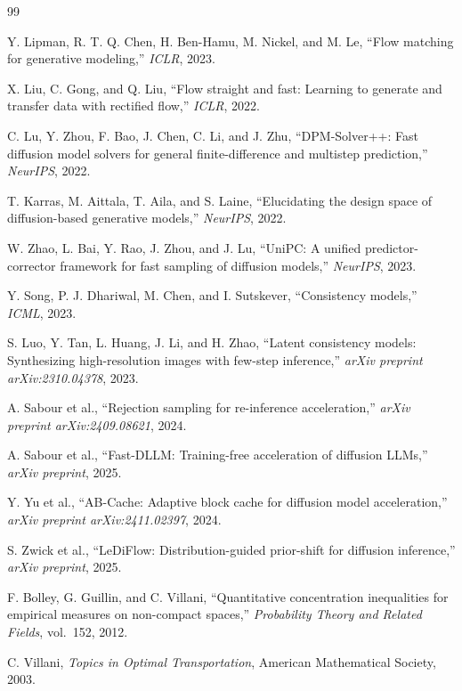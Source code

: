 \documentclass[journal,twocolumn,final]{IEEEtran}
\begin{document}
\begin{thebibliography}{99}

Y. Lipman, R. T. Q. Chen, H. Ben-Hamu, M. Nickel, and M. Le, ``Flow matching
for generative modeling,'' \emph{ICLR}, 2023.

X. Liu, C. Gong, and Q. Liu, ``Flow straight and fast: Learning to generate
and transfer data with rectified flow,'' \emph{ICLR}, 2022.

C. Lu, Y. Zhou, F. Bao, J. Chen, C. Li, and J. Zhu, ``DPM-Solver++: Fast
diffusion model solvers for general finite-difference and multistep
prediction,'' \emph{NeurIPS}, 2022.

T. Karras, M. Aittala, T. Aila, and S. Laine, ``Elucidating the design space
of diffusion-based generative models,'' \emph{NeurIPS}, 2022.

W. Zhao, L. Bai, Y. Rao, J. Zhou, and J. Lu, ``UniPC: A unified predictor-corrector
framework for fast sampling of diffusion models,'' \emph{NeurIPS}, 2023.

Y. Song, P. J. Dhariwal, M. Chen, and I. Sutskever, ``Consistency models,''
\emph{ICML}, 2023.

S. Luo, Y. Tan, L. Huang, J. Li, and H. Zhao, ``Latent consistency models:
Synthesizing high-resolution images with few-step inference,'' \emph{arXiv
preprint arXiv:2310.04378}, 2023.

A. Sabour et al., ``Rejection sampling for re-inference acceleration,''
\emph{arXiv preprint arXiv:2409.08621}, 2024.

A. Sabour et al., ``Fast-DLLM: Training-free acceleration of diffusion LLMs,''
\emph{arXiv preprint}, 2025.

Y. Yu et al., ``AB-Cache: Adaptive block cache for diffusion model
acceleration,'' \emph{arXiv preprint arXiv:2411.02397}, 2024.

S. Zwick et al., ``LeDiFlow: Distribution-guided prior-shift for diffusion
inference,'' \emph{arXiv preprint}, 2025.

F. Bolley, G. Guillin, and C. Villani, ``Quantitative concentration
inequalities for empirical measures on non-compact spaces,'' \emph{Probability
Theory and Related Fields}, vol.~152, 2012.

C. Villani, \emph{Topics in Optimal Transportation}, American Mathematical
Society, 2003.


\end{thebibliography}
\end{document}
